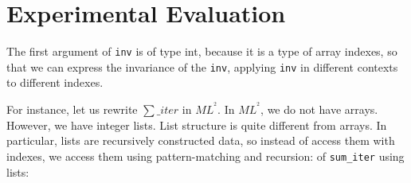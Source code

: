 \documentclass[a4paper,11pt,oneside]{article}
\theoremstyle{plain}
\newcommand{\inlsrc}{\textit{ML}^{^2}}
\begin{document}
% 
% 
% 



\newpage
\section{Experimental Evaluation}

 The first argument of \texttt{inv} is of type int, because it is a type of array indexes, so that we can express the invariance of the \texttt{inv}, applying \texttt{inv} in different contexts to different indexes.
  
	For instance, let us rewrite $\sum\_iter$ in $\inlsrc$.
	In $\inlsrc$, we do not have arrays. However, we have integer lists. 
 List structure is quite different from arrays. 
 In particular, lists are recursively constructed data, so instead of access them with indexes, we access them using pattern-matching and recursion:	
	of \texttt{sum\_iter} using lists: \hypertarget{sum-list-iter}{}
	
\end{document}
